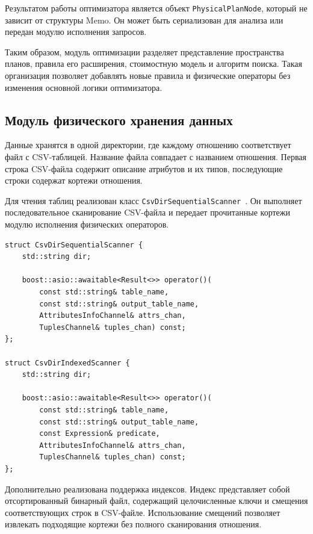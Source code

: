 \documentclass[fontsize=14pt, russian]{scrartcl}
\begin{document}
Результатом работы оптимизатора является объект \verb|PhysicalPlanNode|, который
не зависит от структуры Memo. Он может быть сериализован для анализа или передан
модулю исполнения запросов.

Таким образом, модуль оптимизации разделяет представление пространства планов,
правила его расширения, стоимостную модель и алгоритм поиска. Такая организация
позволяет добавлять новые правила и физические операторы без изменения основной
логики оптимизатора.

\subsection{Модуль физического хранения данных}

Данные хранятся в одной директории, где каждому отношению соответствует
файл с CSV-таблицей. Название файла совпадает с названием отношения.
Первая строка CSV-файла содержит описание атрибутов и их типов,
последующие строки содержат кортежи отношения.

Для чтения таблиц реализован класс
\verb|CsvDirSequentialScanner|~. Он
выполняет последовательное сканирование CSV-файла и передает прочитанные
кортежи модулю исполнения физических операторов.

\begin{listing}[H]
  \caption{Объявления классов сканирования CSV-таблиц.}
  \label{lst:csv-dir-scanners}
  \begin{verbatim}
struct CsvDirSequentialScanner {
    std::string dir;

    boost::asio::awaitable<Result<>> operator()(
        const std::string& table_name,
        const std::string& output_table_name,
        AttributesInfoChannel& attrs_chan,
        TuplesChannel& tuples_chan) const;
};

struct CsvDirIndexedScanner {
    std::string dir;

    boost::asio::awaitable<Result<>> operator()(
        const std::string& table_name,
        const std::string& output_table_name,
        const Expression& predicate,
        AttributesInfoChannel& attrs_chan,
        TuplesChannel& tuples_chan) const;
};
  \end{verbatim}
\end{listing}

Дополнительно реализована поддержка индексов. Индекс представляет собой
отсортированный бинарный файл, содержащий целочисленные ключи и смещения
соответствующих строк в CSV-файле. Использование смещений позволяет
извлекать подходящие кортежи без полного сканирования отношения.
\end{document}
